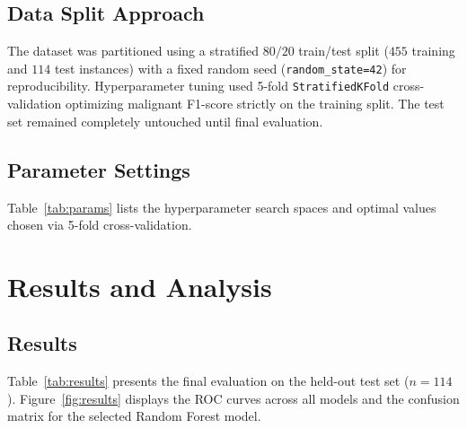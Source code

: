 \documentclass[10pt,twocolumn,a4paper]{IEEEtran}
\begin{document}
\subsection{Data Split Approach}
The dataset was partitioned using a stratified $80/20$ train/test split ($455$ training and $114$ test instances) with a fixed random seed (\texttt{random\_state=42}) for reproducibility. Hyperparameter tuning used 5-fold \texttt{StratifiedKFold} cross-validation optimizing malignant F1-score strictly on the training split. The test set remained completely untouched until final evaluation.

\subsection{Parameter Settings}
Table~\ref{tab:params} lists the hyperparameter search spaces and optimal values chosen via 5-fold cross-validation.

\begin{table}[h]
\centering
\caption{Hyperparameter settings and 5-fold CV F1-scores.}
\label{tab:params}
\end{table}

\section{Results and Analysis}
\subsection{Results}
Table~\ref{tab:results} presents the final evaluation on the held-out test set ($n=114$). Figure~\ref{fig:results} displays the ROC curves across all models and the confusion matrix for the selected Random Forest model.
\end{document}

